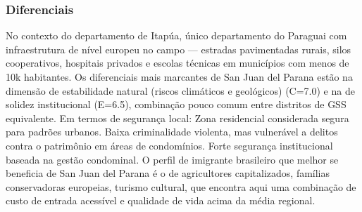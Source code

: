 \subsubsection*{Diferenciais}\label{dif-san-juan-del-parana-0728}
No contexto do departamento de Itapúa, único departamento do Paraguai com infraestrutura de nível europeu no campo — estradas pavimentadas rurais, silos cooperativos, hospitais privados e escolas técnicas em municípios com menos de 10k habitantes. Os diferenciais mais marcantes de San Juan del Parana estão na dimensão de estabilidade natural (riscos climáticos e geológicos) (C=7.0) e na de solidez institucional (E=6.5), combinação pouco comum entre distritos de GSS equivalente. Em termos de segurança local: Zona residencial considerada segura para padrões urbanos. Baixa criminalidade violenta, mas vulnerável a delitos contra o patrimônio em áreas de condomínios. Forte segurança institucional baseada na gestão condominal. O perfil de imigrante brasileiro que melhor se beneficia de San Juan del Parana é o de agricultores capitalizados, famílias conservadoras europeias, turismo cultural, que encontra aqui uma combinação de custo de entrada acessível e qualidade de vida acima da média regional.
